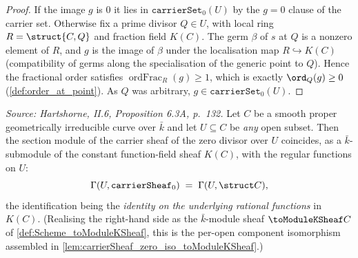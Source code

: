 \begin{proof}
  \leanok
  If the image \(g\) is \(0\) it lies in \(\texttt{carrierSet}_0(U)\) by the
  \(g = 0\) clause of the carrier set. Otherwise fix a prime divisor
  \(Q \in U\), with local ring \(R = \struct{C,Q}\) and fraction field
  \(K(C)\). The germ \(\beta\) of \(s\) at \(Q\) is a nonzero element of \(R\),
  and \(g\) is the image of \(\beta\) under the localisation map
  \(R \hookrightarrow K(C)\) (compatibility of germs along the specialisation
  of the generic point to \(Q\)). Hence the fractional order satisfies
  \(\operatorname{ordFrac}_R(g) \ge 1\), which is exactly \(\ord_Q(g) \ge 0\)
  (\cref{def:order_at_point}). As \(Q\) was arbitrary,
  \(g \in \texttt{carrierSet}_0(U)\).
\end{proof}

\begin{lemma}
  \label{lem:carrierSheaf_zero_sections_eq_structureSheaf}
  \textit{Source: Hartshorne, II.6, Proposition 6.3A, p.~132.}
  Let \(C\) be a smooth proper geometrically irreducible curve over \(\bar k\)
  and let \(U \subseteq C\) be \emph{any} open subset. Then the section module
  of the carrier sheaf of the zero divisor over \(U\) coincides, as a
  \(\bar k\)-submodule of the constant function-field sheaf \(K(C)\), with the
  regular functions on \(U\):
  \[
    \Gamma(U, \texttt{carrierSheaf}_0) \;=\; \Gamma(U, \struct C),
  \]
  the identification being the \emph{identity on the underlying rational
  functions} in \(K(C)\). (Realising the right-hand side as the \(\bar k\)-module
  sheaf \(\toModuleKSheaf C\) of \cref{def:Scheme_toModuleKSheaf}, this is the
  per-open component isomorphism assembled in
  \cref{lem:carrierSheaf_zero_iso_toModuleKSheaf}.)
\end{lemma}

